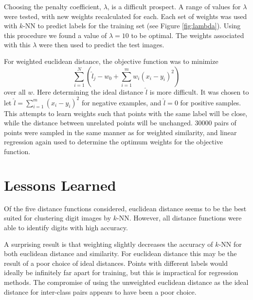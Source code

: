 \documentclass[12pt]{amsart}
\begin{document}
Choosing the penalty coefficient, $\lambda$, is a difficult prospect. A range of values for $\lambda$ were tested, with new weights recalculated for each. Each set of weights was used with $k$-NN to predict labels for the training set (see Figure \ref{fig:lambda}). Using this procedure we found a value of $\lambda=10$ to be optimal. The weights associated with this $\lambda$ were then used to predict the test images.

For weighted euclidean distance, the objective function was to minimize
\[ \sum_{i=1}^N \left( \hat{l}_j - w_0 + \sum_{i=1}^m w_i (x_i-y_i)^2 \right)\]
over all $w$.
Here determining the ideal distance $\hat{l}$ is more difficult. It was chosen to let $\hat{l} = \sum_{i=1}^m (x_i-y_i)^2 $ for negative examples, and $\hat{l}=0$ for positive samples. This attempts to learn weights such that points with the same label will be close, while the distance between unrelated points will be unchanged. 30000 pairs of points were sampled in the same manner as for weighted similarity, and linear regression again used to determine the optimum weights for the objective function.

\section{Lessons Learned}

Of the five distance functions considered, euclidean distance seems to be the best suited for clustering digit images by $k$-NN. However, all distance functions were able to identify digits with high accuracy.

A surprising result is that weighting slightly decreases the accuracy of $k$-NN for both euclidean distance and similarity. For euclidean distance this may be the result of a poor choice of ideal distances. Points with different labels would ideally be infinitely far apart for training, but this is impractical for regression methods. The compromise of using the unweighted euclidean distance as the ideal distance for inter-class pairs appears to have been a poor choice. 
\end{document}
